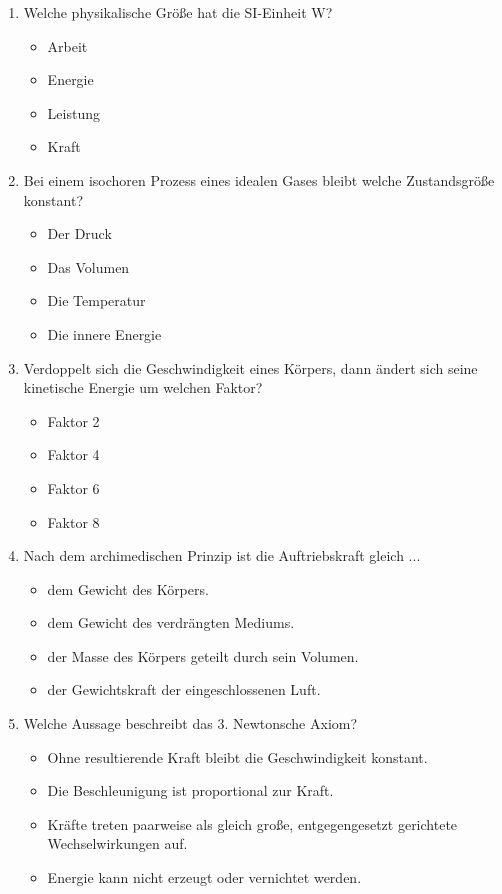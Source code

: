 \documentclass[11pt, a4paper]{article}
\begin{document}
\begin{enumerate}[label=\arabic*.,itemsep=18pt]
    \item Welche physikalische Größe hat die SI-Einheit \si{\watt}?
    \begin{itemize}[label={$\square$},itemsep=1pt,topsep=0pt]
        \item Arbeit
        \item Energie
        \item Leistung
        \item Kraft
    \end{itemize}

    \item Bei einem isochoren Prozess eines idealen Gases bleibt welche Zustandsgröße konstant?
    \begin{itemize}[label={$\square$},itemsep=1pt,topsep=0pt]
        \item Der Druck
        \item Das Volumen
        \item Die Temperatur
        \item Die innere Energie
    \end{itemize}

    \item Verdoppelt sich die Geschwindigkeit eines Körpers, dann ändert sich seine kinetische Energie um welchen Faktor?
    \begin{itemize}[label={$\square$},itemsep=1pt,topsep=0pt]
        \item Faktor 2
        \item Faktor 4
        \item Faktor 6
        \item Faktor 8
    \end{itemize}

    \item Nach dem archimedischen Prinzip ist die Auftriebskraft gleich ...
    \begin{itemize}[label={$\square$},itemsep=1pt,topsep=0pt]
        \item dem Gewicht des Körpers.
        \item dem Gewicht des verdrängten Mediums.
        \item der Masse des Körpers geteilt durch sein Volumen.
        \item der Gewichtskraft der eingeschlossenen Luft.
    \end{itemize}

    \item Welche Aussage beschreibt das 3. Newtonsche Axiom?
    \begin{itemize}[label={$\square$},itemsep=1pt,topsep=0pt]
        \item Ohne resultierende Kraft bleibt die Geschwindigkeit konstant.
        \item Die Beschleunigung ist proportional zur Kraft.
        \item Kräfte treten paarweise als gleich große, entgegengesetzt gerichtete Wechselwirkungen auf.
        \item Energie kann nicht erzeugt oder vernichtet werden.
    \end{itemize}


\end{enumerate}
\end{document}
